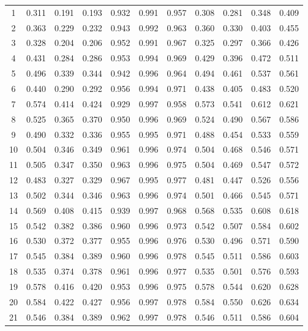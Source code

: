 \begin{longtable}[p]{|c|c|c|c|c|c|c|c|c|c|c|}
	1 & 0.311 & 0.191 & 0.193 & 0.932 & 0.991 & 0.957 & 0.308 & 0.281 & 0.348 & 0.409 \\
	2 & 0.363 & 0.229 & 0.232 & 0.943 & 0.992 & 0.963 & 0.360 & 0.330 & 0.403 & 0.455 \\
	3 & 0.328 & 0.204 & 0.206 & 0.952 & 0.991 & 0.967 & 0.325 & 0.297 & 0.366 & 0.426 \\
	4 & 0.431 & 0.284 & 0.286 & 0.953 & 0.994 & 0.969 & 0.429 & 0.396 & 0.472 & 0.511 \\
	5 & 0.496 & 0.339 & 0.344 & 0.942 & 0.996 & 0.964 & 0.494 & 0.461 & 0.537 & 0.561 \\
	6 & 0.440 & 0.290 & 0.292 & 0.956 & 0.994 & 0.971 & 0.438 & 0.405 & 0.483 & 0.520 \\
	7 & 0.574 & 0.414 & 0.424 & 0.929 & 0.997 & 0.958 & 0.573 & 0.541 & 0.612 & 0.621 \\
	8 & 0.525 & 0.365 & 0.370 & 0.950 & 0.996 & 0.969 & 0.524 & 0.490 & 0.567 & 0.586 \\
	9 & 0.490 & 0.332 & 0.336 & 0.955 & 0.995 & 0.971 & 0.488 & 0.454 & 0.533 & 0.559 \\
	10 & 0.504 & 0.346 & 0.349 & 0.961 & 0.996 & 0.974 & 0.504 & 0.468 & 0.546 & 0.571 \\
	11 & 0.505 & 0.347 & 0.350 & 0.963 & 0.996 & 0.975 & 0.504 & 0.469 & 0.547 & 0.572 \\
	12 & 0.483 & 0.327 & 0.329 & 0.967 & 0.995 & 0.977 & 0.481 & 0.447 & 0.526 & 0.556 \\
	13 & 0.502 & 0.344 & 0.346 & 0.963 & 0.996 & 0.974 & 0.501 & 0.466 & 0.545 & 0.571 \\
	14 & 0.569 & 0.408 & 0.415 & 0.939 & 0.997 & 0.968 & 0.568 & 0.535 & 0.608 & 0.618 \\
	15 & 0.542 & 0.382 & 0.386 & 0.960 & 0.996 & 0.973 & 0.542 & 0.507 & 0.584 & 0.602 \\
	16 & 0.530 & 0.372 & 0.377 & 0.955 & 0.996 & 0.976 & 0.530 & 0.496 & 0.571 & 0.590 \\
	17 & 0.545 & 0.384 & 0.389 & 0.960 & 0.996 & 0.978 & 0.545 & 0.511 & 0.586 & 0.603 \\
	18 & 0.535 & 0.374 & 0.378 & 0.961 & 0.996 & 0.977 & 0.535 & 0.501 & 0.576 & 0.593 \\
	19 & 0.578 & 0.416 & 0.420 & 0.953 & 0.996 & 0.975 & 0.578 & 0.544 & 0.620 & 0.628 \\
	20 & 0.584 & 0.422 & 0.427 & 0.956 & 0.997 & 0.978 & 0.584 & 0.550 & 0.626 & 0.634 \\
	21 & 0.546 & 0.384 & 0.389 & 0.962 & 0.997 & 0.978 & 0.546 & 0.511 & 0.586 & 0.604 \\

\end{longtable}
